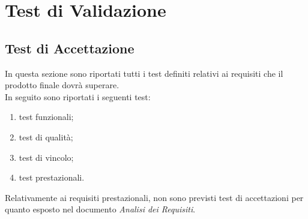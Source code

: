 \section{Test di Validazione}

\subsection{Test di Accettazione}
	In questa sezione sono riportati tutti i test definiti relativi ai requisiti che il prodotto finale dovrà superare.\\
	In seguito sono riportati i seguenti test:
	\begin{enumerate}
		\item test funzionali;
		\item test di qualità;
		\item test di vincolo;
		\item test prestazionali.
	\end{enumerate}
	Relativamente ai requisiti prestazionali, non sono previsti test di accettazioni per quanto esposto nel documento \textit{Analisi dei Requisiti}.
	
	
	
	